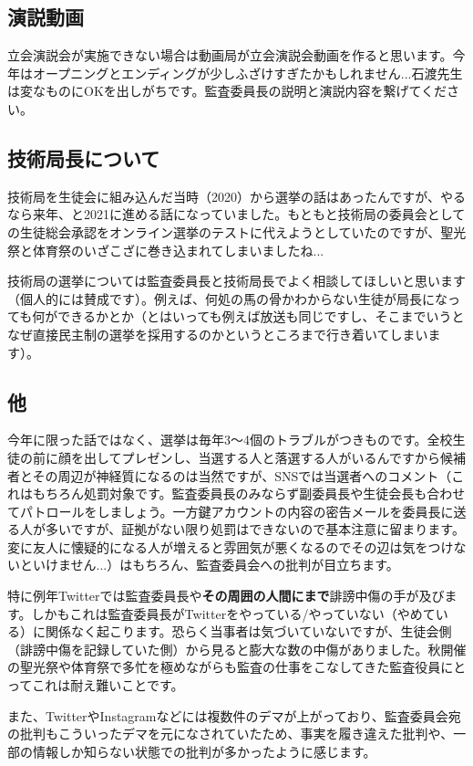 \documentclass[a4paper]{ltjsreport}
\begin{document}
\subsection{演説動画}
立会演説会が実施できない場合は動画局が立会演説会動画を作ると思います。今年はオープニングとエンディングが少しふざけすぎたかもしれません...石渡先生は変なものにOKを出しがちです。監査委員長の説明と演説内容を繋げてください。

\subsection{技術局長について}
技術局を生徒会に組み込んだ当時（2020）から選挙の話はあったんですが、やるなら来年、と2021に進める話になっていました。もともと技術局の委員会としての生徒総会承認をオンライン選挙のテストに代えようとしていたのですが、聖光祭と体育祭のいざこざに巻き込まれてしまいましたね...

技術局の選挙については監査委員長と技術局長でよく相談してほしいと思います（個人的には賛成です）。例えば、何処の馬の骨かわからない生徒が局長になっても何ができるかとか（とはいっても例えば放送も同じですし、そこまでいうとなぜ直接民主制の選挙を採用するのかというところまで行き着いてしまいます）。

\subsection{他}
今年に限った話ではなく、選挙は毎年3〜4個のトラブルがつきものです。全校生徒の前に顔を出してプレゼンし、当選する人と落選する人がいるんですから候補者とその周辺が神経質になるのは当然ですが、SNSでは当選者へのコメント（これはもちろん処罰対象です。監査委員長のみならず副委員長や生徒会長も合わせてパトロールをしましょう。一方鍵アカウントの内容の密告メールを委員長に送る人が多いですが、証拠がない限り処罰はできないので基本注意に留まります。変に友人に懐疑的になる人が増えると雰囲気が悪くなるのでその辺は気をつけないといけません...）はもちろん、監査委員会への批判が目立ちます。

特に例年Twitterでは監査委員長や\textbf{その周囲の人間にまで}誹謗中傷の手が及びます。しかもこれは監査委員長がTwitterをやっている/やっていない（やめている）に関係なく起こります。恐らく当事者は気づいていないですが、生徒会側（誹謗中傷を記録していた側）から見ると膨大な数の中傷がありました。秋開催の聖光祭や体育祭で多忙を極めながらも監査の仕事をこなしてきた監査役員にとってこれは耐え難いことです。

また、TwitterやInstagramなどには複数件のデマが上がっており、監査委員会宛の批判もこういったデマを元になされていたため、事実を履き違えた批判や、一部の情報しか知らない状態での批判が多かったように感じます。
\end{document}
